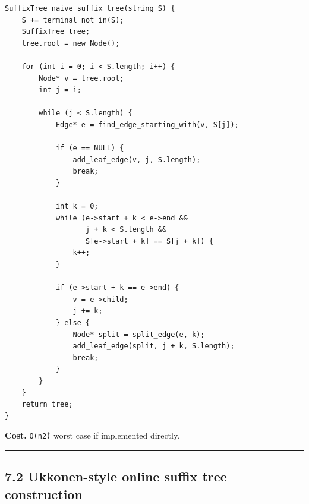 \documentclass[11pt]{article}
\begin{document}
\begin{verbatim}
SuffixTree naive_suffix_tree(string S) {
    S += terminal_not_in(S);
    SuffixTree tree;
    tree.root = new Node();

    for (int i = 0; i < S.length; i++) {
        Node* v = tree.root;
        int j = i;

        while (j < S.length) {
            Edge* e = find_edge_starting_with(v, S[j]);

            if (e == NULL) {
                add_leaf_edge(v, j, S.length);
                break;
            }

            int k = 0;
            while (e->start + k < e->end &&
                   j + k < S.length &&
                   S[e->start + k] == S[j + k]) {
                k++;
            }

            if (e->start + k == e->end) {
                v = e->child;
                j += k;
            } else {
                Node* split = split_edge(e, k);
                add_leaf_edge(split, j + k, S.length);
                break;
            }
        }
    }
    return tree;
}
\end{verbatim}

\textbf{Cost.} \texttt{O(n\^2)} worst case if implemented directly.

\begin{center}\rule{0.5\linewidth}{0.5pt}\end{center}

\subsection{7.2 Ukkonen-style online suffix tree construction}\label{ukkonen-style-online-suffix-tree-construction}
\end{document}
